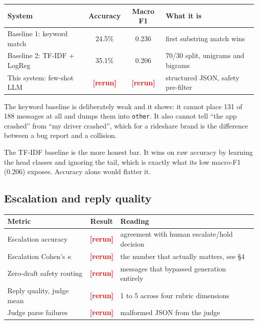 \documentclass[11pt,a4paper]{article}
\newcommand{\rerun}[1]{\textcolor{red}{\textbf{[#1]}}}
\begin{document}
\begin{table}[h]
\centering
\begin{tabular}{lccl}
\toprule
\textbf{System} & \textbf{Accuracy} & \textbf{Macro F1} & \textbf{What it is} \\
\midrule
Baseline 1: keyword match & 24.5\% & 0.236 & first substring match wins \\
Baseline 2: TF-IDF + LogReg & 35.1\% & 0.206 & 70/30 split, unigrams and bigrams \\
This system: few-shot LLM & \rerun{rerun} & \rerun{rerun} & structured JSON, safety pre-filter \\
\bottomrule
\end{tabular}
\end{table}

The keyword baseline is deliberately weak and it shows: it cannot place 131 of 188
messages at all and dumps them into \texttt{other}. It also cannot tell ``the app
crashed'' from ``my driver crashed'', which for a rideshare brand is the difference
between a bug report and a collision.

The TF-IDF baseline is the more honest bar. It wins on raw accuracy by learning the head
classes and ignoring the tail, which is exactly what its low macro-F1 (0.206) exposes.
Accuracy alone would flatter it.

\subsection{Escalation and reply quality}

\begin{table}[h]
\centering
\begin{tabular}{lcl}
\toprule
\textbf{Metric} & \textbf{Result} & \textbf{Reading} \\
\midrule
Escalation accuracy & \rerun{rerun} & agreement with human escalate/hold decision \\
Escalation Cohen's $\kappa$ & \rerun{rerun} & the number that actually matters, see \S4 \\
Zero-draft safety routing & \rerun{rerun} & messages that bypassed generation entirely \\
Reply quality, judge mean & \rerun{rerun} & 1 to 5 across four rubric dimensions \\
Judge parse failures & \rerun{rerun} & malformed JSON from the judge \\
\bottomrule
\end{tabular}
\end{table}
\end{document}
